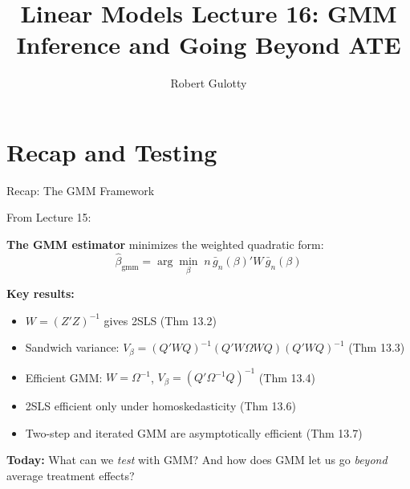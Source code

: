 \documentclass[aspectratio=169, handout]{beamer}
\title[PLSC 30700]{Linear Models Lecture 16: GMM Inference and Going Beyond ATE}
\author{Robert Gulotty}
\institute[Chicago]{University of Chicago}
\numberwithin{equation}{section}
\begin{document}
\section{Recap and Testing}

\begin{frame}
\titlepage
\end{frame}

\begin{frame}{Recap: The GMM Framework}

From Lecture 15:

\medskip
\textbf{The GMM estimator} minimizes the weighted quadratic form:
$$\hat\beta_{\text{gmm}} = \arg\min_\beta\; n\,\bar{g}_n(\beta)' W\, \bar{g}_n(\beta)$$

\medskip
\textbf{Key results:}
\begin{itemize}
\item $W = (Z'Z)^{-1}$ gives 2SLS (Thm 13.2)
\item Sandwich variance: $V_\beta = (Q'WQ)^{-1}(Q'W\Omega WQ)(Q'WQ)^{-1}$ (Thm 13.3)
\item Efficient GMM: $W = \Omega^{-1}$, $V_\beta = (Q'\Omega^{-1}Q)^{-1}$ (Thm 13.4)
\item 2SLS efficient only under homoskedasticity (Thm 13.6)
\item Two-step and iterated GMM are asymptotically efficient (Thm 13.7)
\end{itemize}

\medskip
\textbf{Today:} What can we \textit{test} with GMM? And how does GMM let us go \textit{beyond} average treatment effects?

\end{frame}
\end{document}
